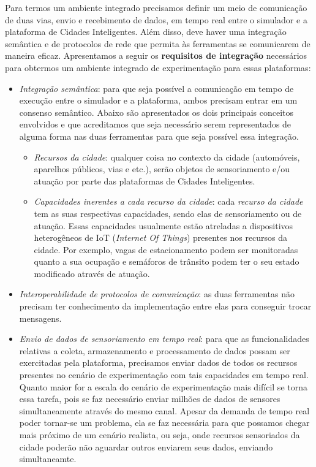 Para termos um ambiente integrado precisamos definir um meio de comunicação de duas vias, envio e recebimento de dados, em tempo real entre o simulador e a plataforma de Cidades Inteligentes.
Além disso, deve haver uma integração semântica e de protocolos de rede que permita às ferramentas se comunicarem de maneira eficaz.
Apresentamos a seguir os \textbf{requisitos de integração} necessários para obtermos um ambiente integrado de experimentação para essas plataformas:

\begin{itemize}
    \item \textit{Integração semântica}: para que seja possível a comunicação em tempo de execução entre o simulador e a plataforma, ambos precisam entrar em um consenso semântico.
        Abaixo são apresentados os dois principais conceitos envolvidos e que acreditamos que seja necessário serem representados de alguma forma nas duas ferramentas para que seja
        possível essa integração.

        \begin{itemize}
            \item \textit{Recursos da cidade}: qualquer coisa no contexto da cidade (automóveis, aparelhos públicos, vias e etc.), serão objetos de
                sensoriamento e/ou atuação por parte das plataformas de Cidades Inteligentes.

            \item \textit{Capacidades inerentes a cada recurso da cidade}: cada \textit{recurso da cidade} tem as suas respectivas capacidades, sendo elas de sensoriamento ou de atuação.
                Essas capacidades usualmente estão atreladas a dispositivos heterogêneos de IoT (\textit{Internet Of Things}) presentes nos recursos da cidade.
                Por exemplo, vagas de estacionamento podem ser monitoradas quanto a sua ocupação e semáforos de trânsito podem ter o seu estado modificado através de atuação.
        \end{itemize}

    \item \textit{Interoperabilidade de protocolos de comunicação}: as duas ferramentas não precisam ter conhecimento da implementação entre elas para conseguir trocar mensagens.

    \item \textit{Envio de dados de sensoriamento em tempo real}: para que as funcionalidades relativas a coleta, armazenamento e processamento de dados possam ser
        exercitadas pela plataforma, precisamos enviar dados de todos os recursos presentes no cenário de experimentação com tais capacidades em tempo real.
        Quanto maior for a escala do cenário de experimentação mais difícil se torna essa tarefa, pois se faz necessário enviar milhões de dados de sensores simultaneamente através
        do mesmo canal.
        Apesar da demanda de tempo real poder tornar-se um problema, ela se faz necessária para que possamos chegar mais próximo de um cenário realista, ou seja, onde recursos sensoriados
        da cidade poderão não aguardar outros enviarem seus dados, enviando simultaneamte.


\end{itemize}
